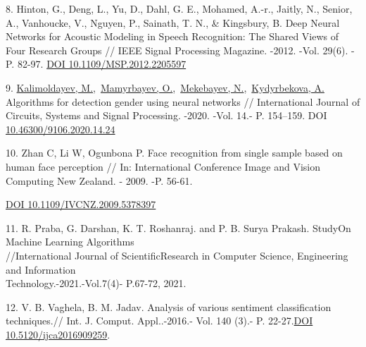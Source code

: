 \begin{references}
8. Hinton, G., Deng, L., Yu, D., Dahl, G. E., Mohamed, A.-r., Jaitly, N.,
Senior, A., Vanhoucke, V., Nguyen, P., Sainath, T. N., \& Kingsbury,
B. Deep Neural Networks for Acoustic Modeling in Speech Recognition:
The Shared Views of Four Research Groups // IEEE Signal Processing
Magazine. -2012. -Vol. 29(6). -P. 82-97.
\href{https://doi.org/10.1109/MSP.2012.2205597}{DOI
10.1109/MSP.2012.2205597}

9. \href{https://www.scopus.com/authid/detail.uri?authorId=56153126500}{Kalimoldayev,
M.},~\href{https://www.scopus.com/authid/detail.uri?authorId=55967630400}{Mamyrbayev,
O.},~\href{https://www.scopus.com/authid/detail.uri?authorId=57202316868}{Mekebayev,
N.},~\href{https://www.scopus.com/authid/detail.uri?authorId=57208346238}{Kydyrbekova,
A.} Algorithms for detection gender using neural networks //
International Journal of Circuits, Systems and Signal
Processing. -2020. -Vol. 14.- P. 154--159. DOI
\href{https://doi.org/10.46300/9106.2020.14.24}{10.46300/9106.2020.14.24}

10. Zhan C, Li W, Ogunbona P. Face recognition from single sample based on
human face perception // In: International Conference Image and Vision
Computing New Zealand. - 2009. -P. 56-61.

\href{https://doi.org/10.1109/IVCNZ.2009.5378397}{DOI 10.1109/IVCNZ.2009.5378397}

11. R. Praba, G. Darshan, K. T. Roshanraj. and P. B. Surya Prakash.
StudyOn Machine Learning Algorithms\\//International Journal of
ScientificResearch in Computer Science, Engineering and Information\\
Technology.-2021.-Vol.7(4)- P.67-72, 2021.

12. V. B. Vaghela, B. M. Jadav. Analysis of various sentiment
classification techniques.// Int. J. Comput. Appl..-2016.- Vol. 140
(3).- P. 22-27.\href{https://doi.org/10.5120/ijca2016909259}{DOI
10.5120/ijca2016909259}.
\end{references}

